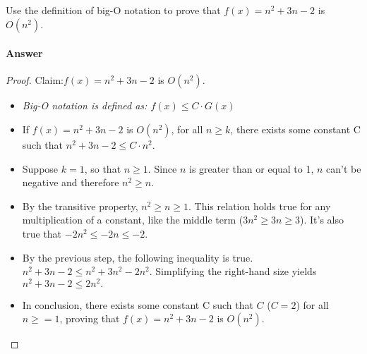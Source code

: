 \documentclass{article}
\begin{document}
Use the definition of big-O notation to prove that $f(x)=n^2 + 3n -2$ is
$O(n^2)$.

\paragraph{Answer}
\begin{proof}{Claim:}{$f(x)=n^2 + 3n -2$ is $O(n^2)$.} 
\begin{itemize}
\item \emph{Big-O notation is defined as: $f(x) \leq C\cdot{G(x)}$}
\item { If $f(x)=n^2 + 3n - 2$ is $O(n^2)$, for all $n \geq k$, there exists some constant C such that $n^2 + 3n - 2 \leq C\cdot{n^2}$.}
\item{Suppose $k = 1$, so that $n \geq 1.$ Since $n$ is greater than or equal to 1, $n$ can't be negative and therefore $n^2 \geq n$.}
\item{By the transitive property, $n^2 \geq n \geq 1$. This relation holds true for any multiplication of a constant, like the middle term ($3n^2 \geq 3n \geq 3$). It's also true that $-2n^2 \leq -2n \leq -2.$}
\item{By the previous step, the following inequality is true. $n^2 + 3n - 2 \leq n^2 + 3n^2 - 2n^2.$ Simplifying the right-hand size yields $n^2 + 3n - 2 \leq 2n^2.$}
\item{In conclusion, there exists some constant C such that $C$ ($C = 2$) for all $n \geq = 1$, proving that $f(x)=n^2 + 3n -2$ is $O(n^2)$.}
\end{itemize}
\end{proof}
\end{document}
